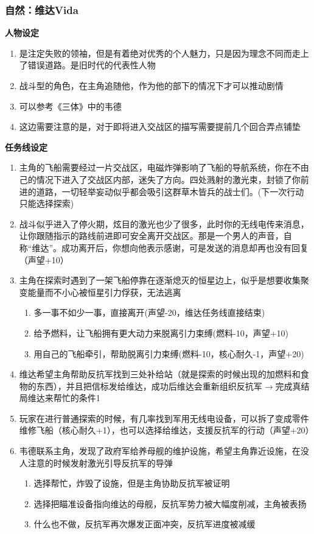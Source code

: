 \documentclass{ctexart}
\begin{document}
			\subsubsection{自然：维达Vida}
			\textbf{人物设定}
			\begin{enumerate}
				\item 是注定失败的领袖，但是有着绝对优秀的个人魅力，只是因为理念不同而走上了错误道路。是旧时代的代表性人物
				\item 战斗型的角色，在主角追随他，作为他的部下的情况下才可以推动剧情
				\item 可以参考《三体》中的韦德
				\item 这边需要注意的是，对于即将进入交战区的描写需要提前几个回合弄点铺垫
			\end{enumerate}
			\textbf{任务线设定}
			\begin{enumerate}
				\item 主角的飞船需要经过一片交战区，电磁炸弹影响了飞船的导航系统，你在不由己的情况下进入了交战区内部，迷失了方向。四处溅射的激光束，封锁了你前进的道路，一切轻举妄动似乎都会吸引这群草木皆兵的战士们。(下一次行动只能选择探索)
				\item 战斗似乎进入了停火期，炫目的激光也少了很多，此时你的无线电传来消息，让你跟随指示的路线前进即可安全离开交战区。那是一个男人的声音，自称“维达”。成功离开后，你想向他表示感谢，可是发送的消息却再也没有回复（声望+10）
				\item 主角在探索时遇到了一架飞船停靠在逐渐熄灭的恒星边上，似乎是想要收集聚变能量而不小心被恒星引力俘获，无法逃离
					\begin{enumerate}
						\item 多一事不如少一事，直接离开(声望-20，维达任务线直接结束)
						\item 给予燃料，让飞船拥有更大动力来脱离引力束缚(燃料-10，声望+10)
						\item 用自己的飞船牵引，帮助脱离引力束缚(燃料-10，核心耐久-1，声望+20)
					\end{enumerate}
				\item 维达希望主角帮助反抗军找到三处补给站（就是探索的时候出现的加燃料和食物的东西），并且把信标发给维达，成功后维达会重新组织反抗军$\rightarrow$完成真结局维达来帮忙的条件1
				\item 玩家在进行普通探索的时候，有几率找到军用无线电设备，可以拆了变成零件维修飞船（核心耐久+1），也可以选择给维达，支援反抗军的行动（声望+20）
				\item 韦德联系主角，发现了政府军给养母舰的维护设施，希望主角靠近设施，在没人注意的时候发射激光引导反抗军的导弹
					\begin{enumerate}
						\item 选择帮忙，炸毁了设施，但是主角协助反抗军被证明
						\item 选择把瞄准设备指向维达的母舰，反抗军势力被大幅度削减，主角被表扬
						\item 什么也不做，反抗军再次爆发正面冲突，反抗军进度被减缓
					\end{enumerate}
			\end{enumerate}
\end{document}
